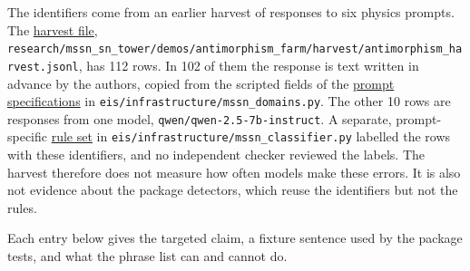 \documentclass[
  11pt,
]{article}
\begin{document}
The identifiers come from an earlier harvest of responses to six physics
prompts. The
\href{https://github.com/dbccpage/the_symbol_game/blob/52cb5457f6c485ba548cfd292f6012a941ed22cf/research/mssn_sn_tower/demos/antimorphism_farm/harvest/antimorphism_harvest.jsonl}{harvest
file},
\nolinkurl{research/mssn_sn_tower/demos/antimorphism_farm/harvest/antimorphism_harvest.jsonl},
has 112 rows. In 102 of them the response is text written in advance by
the authors, copied from the scripted fields of the
\href{https://github.com/dbccpage/the_symbol_game/blob/52cb5457f6c485ba548cfd292f6012a941ed22cf/eis/infrastructure/mssn_domains.py}{prompt
specifications} in
\nolinkurl{eis/infrastructure/mssn_domains.py}.
The other 10 rows are responses from one model,
\nolinkurl{qwen/qwen-2.5-7b-instruct}. A separate, prompt-specific
\href{https://github.com/dbccpage/the_symbol_game/blob/52cb5457f6c485ba548cfd292f6012a941ed22cf/eis/infrastructure/mssn_classifier.py}{rule
set} in
\nolinkurl{eis/infrastructure/mssn_classifier.py}
labelled the rows with these identifiers, and no independent checker
reviewed the labels. The harvest therefore does not measure how often
models make these errors. It is also not evidence about the package
detectors, which reuse the identifiers but not the rules.

Each entry below gives the targeted claim, a fixture sentence used by
the package tests, and what the phrase list can and cannot do.
\end{document}
